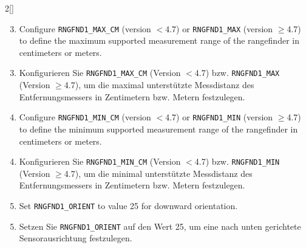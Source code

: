 \begin{paracol}{2}[]
\begin{enumerate} 
\setcounter{enumi}{2}
\item Configure \texttt{RNGFND1\_MAX\_CM} (version \(<\)4.7) or \texttt{RNGFND1\_MAX} (version \(\geq\)4.7) to define the maximum supported measurement range of the rangefinder in centimeters or meters.
\end{enumerate} 

\colger

\begin{enumerate}
\setcounter{enumi}{2}
\item Konfigurieren Sie \texttt{RNGFND1\_MAX\_CM} (Version \(<\)4.7) bzw. \texttt{RNGFND1\_MAX} (Version \(\geq\)4.7), um die maximal unterstützte Messdistanz des Entfernungsmessers in Zentimetern bzw. Metern festzulegen.
\end{enumerate}

\coleng

\begin{enumerate} 
\setcounter{enumi}{3}
\item Configure \texttt{RNGFND1\_MIN\_CM} (version \(<\)4.7) or \texttt{RNGFND1\_MIN} (version \(\geq\)4.7) to define the minimum supported measurement range of the rangefinder in centimeters or meters.
\end{enumerate} 

\colger

\begin{enumerate}
\setcounter{enumi}{3}
\item Konfigurieren Sie \texttt{RNGFND1\_MIN\_CM} (Version \(<\)4.7) bzw. \texttt{RNGFND1\_MIN} (Version \(\geq\)4.7), um die minimal unterstützte Messdistanz des Entfernungsmessers in Zentimetern bzw. Metern festzulegen.
\end{enumerate}

\coleng

\begin{enumerate} 
\setcounter{enumi}{4}
\item Set \texttt{RNGFND1\_ORIENT} to value 25 for downward orientation.
\end{enumerate} 

\colger

\begin{enumerate}
\setcounter{enumi}{4}
\item Setzen Sie \texttt{RNGFND1\_ORIENT} auf den Wert 25, um eine nach unten gerichtete Sensorausrichtung festzulegen.
\end{enumerate}

\coleng


\end{paracol}
